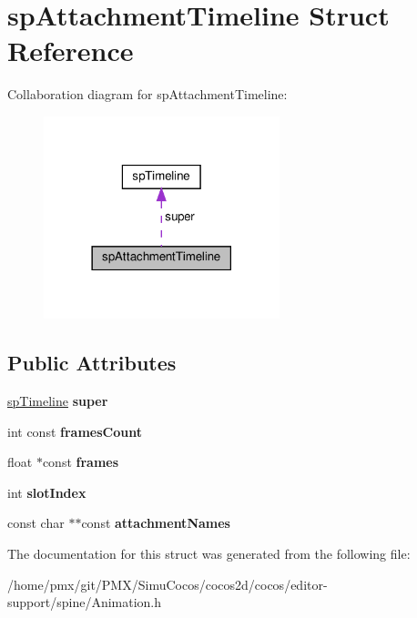 \hypertarget{structspAttachmentTimeline}{}\section{sp\+Attachment\+Timeline Struct Reference}
\label{structspAttachmentTimeline}


Collaboration diagram for sp\+Attachment\+Timeline\+:
\nopagebreak
\begin{figure}[H]
\begin{center}
\leavevmode
\includegraphics[width=194pt]{structspAttachmentTimeline__coll__graph}
\end{center}
\end{figure}
\subsection*{Public Attributes}
\begin{DoxyCompactItemize}
\item 
\mbox{\label{structspAttachmentTimeline_a3a9f791c5f7e09345e3274bad9dd072b}} 
\hyperlink{structspTimeline}{sp\+Timeline} {\bfseries super}
\item 
\mbox{\label{structspAttachmentTimeline_ab596b9a997d037e803d17009bacfb2c1}} 
int const {\bfseries frames\+Count}
\item 
\mbox{\label{structspAttachmentTimeline_a9f7f0e643e22b7fd45bc1ce5b615d868}} 
float $\ast$const {\bfseries frames}
\item 
\mbox{\label{structspAttachmentTimeline_afe12f95659473ebd41c15886a494dde5}} 
int {\bfseries slot\+Index}
\item 
\mbox{\label{structspAttachmentTimeline_aa2e667a24452a3a25ea94d3cb422173c}} 
const char $\ast$$\ast$const {\bfseries attachment\+Names}
\end{DoxyCompactItemize}


The documentation for this struct was generated from the following file\+:\begin{DoxyCompactItemize}
\item 
/home/pmx/git/\+P\+M\+X/\+Simu\+Cocos/cocos2d/cocos/editor-\/support/spine/Animation.\+h\end{DoxyCompactItemize}
